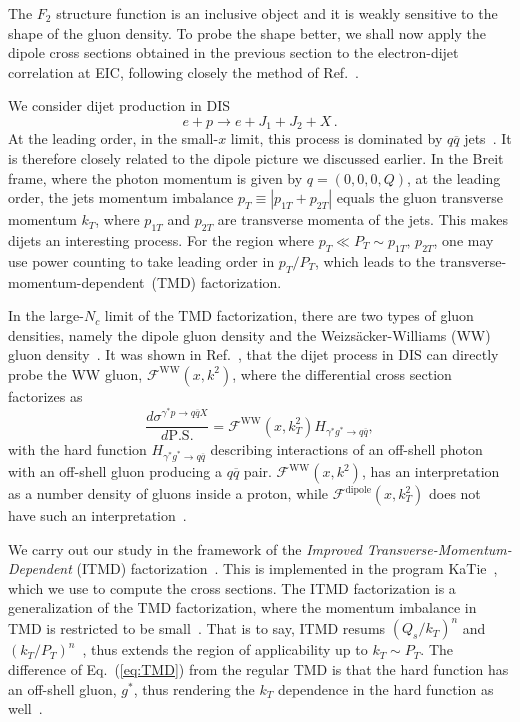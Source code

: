 \documentclass[11pt]{article}
\newcommand{\fww}[0]{\mathcal{F}^{\mathrm{WW}}}
\newcommand{\fdp}[0]{\mathcal{F}^{\mathrm{dipole}}}
\begin{document}
The $F_2$ structure function is an inclusive object and it is weakly sensitive
to the shape of the gluon density. To probe the shape better, we shall now apply the
dipole cross sections obtained in the previous section to the electron-dijet
correlation at EIC, following closely the method of Ref.~\cite{vanHameren:2021sqc}.  

We consider dijet production in DIS
%
\begin{equation}
  e+p\rightarrow e+J_1+J_2+X\,.
\end{equation}
%
At the leading order, in the small-$x$ limit, this process is
dominated by $q\overline{q}$ jets~\cite{Dominguez:2011wm}.  It is
therefore closely related to the dipole picture we discussed earlier. In the Breit frame, where the photon momentum is
given by $q=(0,0,0,Q)$, at the leading order, the jets momentum imbalance
$p_T\equiv\left|p_{1T}+p_{2T}\right|$ equals the gluon transverse momentum
$k_T$, where $p_{1T}$ and $p_{2T}$ are transverse momenta of the jets.  This
makes dijets an interesting process. For the region where $p_T\ll P_T\sim
p_{1T},\,p_{2T}$, one may use power counting to take leading order in $p_T/P_T$,
which leads to the transverse-momentum-dependent~(TMD) factorization.
  
In the large-$N_c$ limit of the TMD factorization, there are two types of gluon
densities, namely the dipole gluon density and the Weizs\"acker-Williams (WW)
gluon
density~\cite{Dominguez:2010xd,Dominguez:2011wm,vanHameren:2016ftb,Xiao:2017ggh}.
It was shown in Ref.~\cite{Dominguez:2011wm}, that the dijet process in DIS can
directly probe the WW gluon, $\fww(x,k^2)$, where the differential cross section
factorizes as
%
\begin{equation}
	\frac{d\sigma^{\gamma^*p\rightarrow q\overline{q}X}}{d \mathrm{P.S.}}=\fww(x,k_T^2)H_{\gamma^*g^*\rightarrow q\overline{q}},
        \label{eq:TMD}
\end{equation}
%
with the hard function $H_{\gamma^*g^*\rightarrow q\overline{q}}$ describing
interactions of an off-shell photon with an off-shell gluon producing a
$q\overline{q}$ pair.  $\fww(x,k^2)$, has an interpretation as a number density
of gluons inside a proton, while $\fdp(x,k_T^2)$ does not have such an
interpretation~\cite{Dominguez:2010xd,Dominguez:2011wm,Xiao:2017ggh}.  

We carry out our study in the framework of the {\it Improved
Transverse-Momentum-Dependent} (ITMD)
factorization~\cite{Kotko:2015ura,vanHameren:2016ftb}.  This is
implemented in the program KaTie~\cite{vanHameren:2016kkz}, which we use to
compute the cross sections.  The ITMD factorization is a generalization of the
TMD factorization, where the momentum imbalance in TMD is restricted to be
small~\cite{Kotko:2015ura,vanHameren:2016ftb}. That is to say, ITMD resums
$(Q_s/k_T)^n$ and $(k_T/P_T)^n$~\cite{Kotko:2015ura,vanHameren:2016ftb}, thus
extends the region of applicability up to $k_T\sim P_T$. The difference of
Eq.~(\ref{eq:TMD}) from the regular TMD is that the hard function has an
off-shell gluon, $g^*$, thus rendering the $k_T$ dependence in the hard function
as well~\cite{Kotko:2015ura}.
\end{document}
